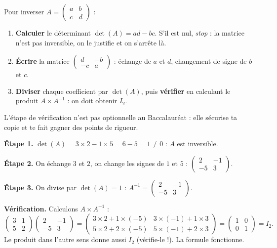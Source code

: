 \documentclass[11pt]{article}
\begin{document}
\begin{methode}
Pour inverser $A = \begin{pmatrix} a & b \\ c & d \end{pmatrix}$ :
\begin{enumerate}
\item \textbf{Calculer} le déterminant $\det(A) = ad - bc$. S'il est nul, \emph{stop} : la matrice n'est pas inversible, on le justifie et on s'arrête là.
\item \textbf{Écrire} la matrice $\begin{pmatrix} d & -b \\ -c & a \end{pmatrix}$ : échange de $a$ et $d$, changement de signe de $b$ et $c$.
\item \textbf{Diviser} chaque coefficient par $\det(A)$, puis \textbf{vérifier} en calculant le produit $A \times A^{-1}$ : on doit obtenir $I_2$.
\end{enumerate}
L'étape de vérification n'est pas optionnelle au Baccalauréat : elle sécurise ta copie et te fait gagner des points de rigueur.
\end{methode}

\begin{exemplebox}[Inverse de $A = \begin{pmatrix} 3 & 1 \\ 5 & 2 \end{pmatrix}$, avec vérification]
\textbf{Étape 1.} $\det(A) = 3\times 2 - 1\times 5 = 6 - 5 = 1 \neq 0$ : $A$ est inversible.

\textbf{Étape 2.} On échange $3$ et $2$, on change les signes de $1$ et $5$ : $\begin{pmatrix} 2 & -1 \\ -5 & 3 \end{pmatrix}$.

\textbf{Étape 3.} On divise par $\det(A) = 1$ : $A^{-1} = \begin{pmatrix} 2 & -1 \\ -5 & 3 \end{pmatrix}$.

\textbf{Vérification.} Calculons $A \times A^{-1}$ :
\[ \begin{pmatrix} 3 & 1 \\ 5 & 2 \end{pmatrix} \begin{pmatrix} 2 & -1 \\ -5 & 3 \end{pmatrix} = \begin{pmatrix} 3\times 2 + 1\times(-5) & 3\times(-1) + 1\times 3 \\ 5\times 2 + 2\times(-5) & 5\times(-1) + 2\times 3 \end{pmatrix} = \begin{pmatrix} 1 & 0 \\ 0 & 1 \end{pmatrix} = I_2. \]
Le produit dans l'autre sens donne aussi $I_2$ (vérifie-le !). La formule fonctionne.
\end{exemplebox}
\end{document}
